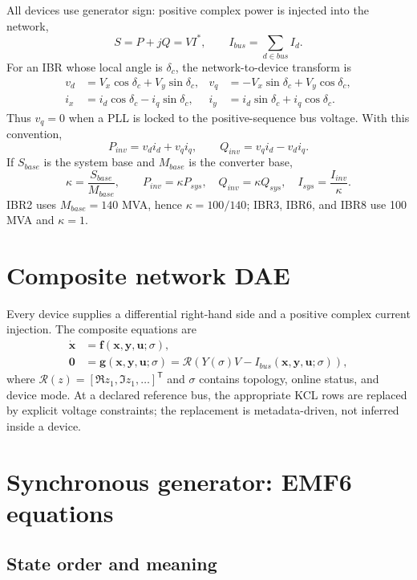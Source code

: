 \documentclass[12pt,a4paper]{article}
\newcommand{\vect}[1]{\boldsymbol{#1}}
\begin{document}
All devices use generator sign: positive complex power is injected into the
network,
\[
S=P+jQ=V I^*,\qquad I_{bus}=\sum_{d\in bus} I_d.
\]
For an IBR whose local angle is \(\delta_c\), the network-to-device transform is
\begin{align}
v_d&=V_x\cos\delta_c+V_y\sin\delta_c,&
v_q&=-V_x\sin\delta_c+V_y\cos\delta_c,\\
i_x&=i_d\cos\delta_c-i_q\sin\delta_c,&
i_y&=i_d\sin\delta_c+i_q\cos\delta_c.
\end{align}
Thus \(v_q=0\) when a PLL is locked to the positive-sequence bus voltage.
With this convention,
\[
P_{inv}=v_di_d+v_qi_q,\qquad Q_{inv}=v_qi_d-v_di_q.
\]
If \(S_{base}\) is the system base and \(M_{base}\) is the converter base,
\[
\kappa=\frac{S_{base}}{M_{base}},\qquad
P_{inv}=\kappa P_{sys},\quad Q_{inv}=\kappa Q_{sys},\quad
I_{sys}=\frac{I_{inv}}{\kappa}.
\]
IBR2 uses \(M_{base}=140\) MVA, hence \(\kappa=100/140\); IBR3, IBR6,
and IBR8 use 100 MVA and \(\kappa=1\).

\section{Composite network DAE}

Every device supplies a differential right-hand side and a positive complex
current injection.  The composite equations are
\begin{align}
\dot{\vect x}&=\vect f(\vect x,\vect y,\vect u;\sigma),\\
\vect 0&=\vect g(\vect x,\vect y,\vect u;\sigma)
          =\mathcal R\!\left(Y(\sigma)V-I_{bus}(\vect x,\vect y,\vect u;\sigma)\right),
\end{align}
where \(\mathcal R(z)=[\Re z_1,\Im z_1,\ldots]^{\mathsf T}\) and \(\sigma\)
contains topology, online status, and device mode.  At a declared reference
bus, the appropriate KCL rows are replaced by explicit voltage constraints;
the replacement is metadata-driven, not inferred inside a device.

\section{Synchronous generator: EMF6 equations}

\subsection{State order and meaning}
\end{document}
